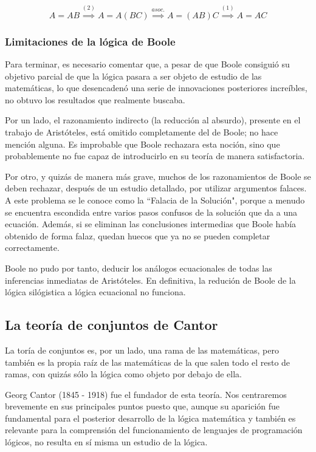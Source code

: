 \documentclass{article}
\begin{document}
$$
   A = AB \overset{(2)}{\implies} A = A(BC) \overset{asoc.}{\implies} A = (AB)C \overset{(1)}{\implies} A = AC
$$

\subsubsection{Limitaciones de la lógica de Boole}

Para terminar, es necesario comentar que, a pesar de que Boole consiguió su objetivo parcial de que la lógica pasara a ser objeto de estudio de las matemáticas, lo que desencadenó una serie de innovaciones posteriores increíbles, no obtuvo los resultados que realmente buscaba.

Por un lado, el razonamiento indirecto (la reducción al absurdo), presente en el trabajo de Aristóteles, está omitido completamente del de Boole; no hace mención alguna. Es improbable que Boole rechazara esta noción, sino que probablemente no fue capaz de introducirlo en su teoría de manera satisfactoria.

Por otro, y quizás de manera más grave, muchos de los razonamientos de Boole se deben rechazar, después de un estudio detallado, por utilizar argumentos falaces. A este problema se le conoce como la ``Falacia de la Solución", porque a menudo se encuentra escondida entre varios pasos confusos de la solución que da a una ecuación. Además, si se eliminan las conclusiones intermedias que Boole había obtenido de forma falaz, quedan huecos que ya no se pueden completar correctamente.

Boole no pudo por tanto, deducir los análogos ecuacionales de todas las inferencias inmediatas de Aristóteles. En definitiva, la redución de Boole de la lógica silógistica a lógica ecuacional no funciona\cite{sanchez2004algebra}.

\subsection{La teoría de conjuntos de Cantor}

La toría de conjuntos es, por un lado, una rama de las matemáticas, pero también es la propia raíz de las matemáticas de la que salen todo el resto de ramas, con quizás sólo la lógica como objeto por debajo de ella\cite{vaught2001set}.

Georg Cantor (1845 - 1918) fue el fundador de esta teoría. Nos centraremos brevemente en sus principales puntos puesto que, aunque su aparición fue fundamental para el posterior desarrollo de la lógica matemática y también es relevante para la comprensión del funcionamiento de lenguajes de programación lógicos, no resulta en sí misma un estudio de la lógica.
\end{document}
